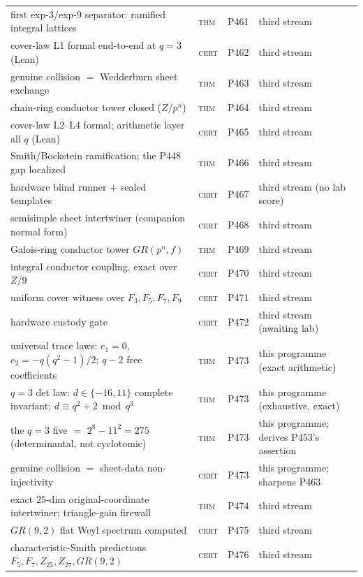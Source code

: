 \documentclass[12pt,a4paper]{article}
\def\mathbb#1{#1}%
\def\mathrm#1{#1}%
\def\cdot{ }%
\theoremstyle{definition}
\newcommand{\FF}{\mathbb{F}}
\newcommand{\ZZ}{\mathbb{Z}}
\begin{document}
\begin{center}
\begin{tabular}{@{}p{}llp{}@{}}
first exp-$3$/exp-$9$ separator: ramified integral lattices & \textsc{thm} & P461 & third stream \\
cover-law L1 formal end-to-end at $q{=}3$ (Lean) & \textsc{cert} & P462 & third stream \\
genuine collision $=$ Wedderburn sheet exchange & \textsc{thm} & P463 & third stream \\
chain-ring conductor tower closed ($\ZZ/p^n$) & \textsc{thm} & P464 & third stream \\
cover-law L2--L4 formal; arithmetic layer all $q$ (Lean) & \textsc{cert} & P465 & third stream \\
Smith/Bockstein ramification; the P448 gap localized & \textsc{thm} & P466 & third stream \\
hardware blind runner $+$ sealed templates & \textsc{cert} & P467 & third stream (no lab score) \\
semisimple sheet intertwiner (companion normal form) & \textsc{cert} & P468 & third stream \\
Galois-ring conductor tower $\mathrm{GR}(p^n,f)$ & \textsc{thm} & P469 & third stream \\
integral conductor coupling, exact over $\ZZ/9$ & \textsc{cert} & P470 & third stream \\
uniform cover witness over $\FF_3,\FF_5,\FF_7,\FF_9$ & \textsc{cert} & P471 & third stream \\
hardware custody gate & \textsc{cert} & P472 & third stream (awaiting lab) \\
universal trace laws: $e_1{=}0$, $e_2{=}-q(q^2{-}1)/2$; $q{-}2$ free coefficients & \textsc{thm} & P473 & this programme (exact arithmetic) \\
$q{=}3$ det law: $d\in\{-16,11\}$ complete invariant; $d\equiv q^2{+}2 \bmod q^3$ & \textsc{thm} & P473 & this programme (exhaustive, exact) \\
the $q{=}3$ five $=$ $2^8-11^2 = 27\cdot5$ (determinantal, not cyclotomic) & \textsc{thm} & P473 & this programme; derives P453's assertion \\
genuine collision $=$ sheet-data non-injectivity & \textsc{cert} & P473 & this programme; sharpens P463 \\
exact $25$-dim original-coordinate intertwiner; triangle-gain firewall & \textsc{thm} & P474 & third stream \\
$\mathrm{GR}(9,2)$ flat Weyl spectrum computed & \textsc{cert} & P475 & third stream \\
characteristic-Smith predictions $\FF_5,\FF_7,\ZZ_{25},\ZZ_{27},\mathrm{GR}(9,2)$ & \textsc{cert} & P476 & third stream \\

\end{tabular}
\end{center}
\end{document}

